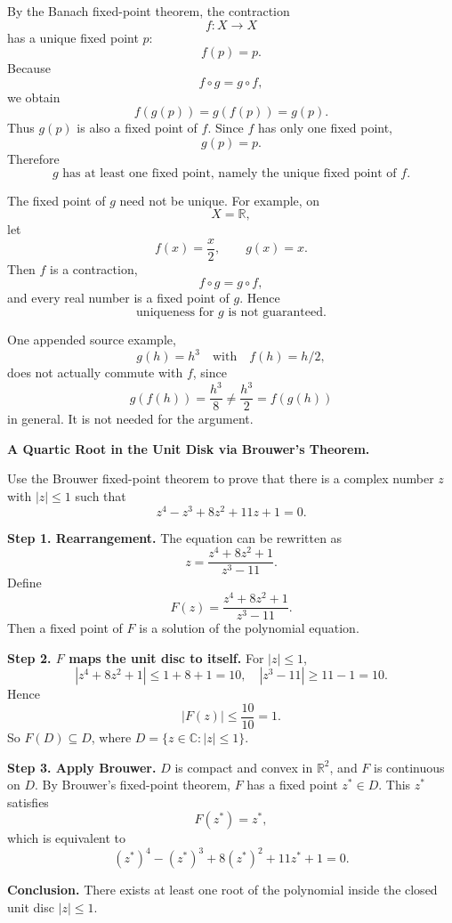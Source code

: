 \begin{solution}
By the Banach fixed-point theorem, the contraction
\[
f:X\to X
\]
has a unique fixed point \(p\):
\[
f(p)=p.
\]
Because
\[
f\circ g=g\circ f,
\]
we obtain
\[
f(g(p))
=
g(f(p))
=
g(p).
\]
Thus \(g(p)\) is also a fixed point of \(f\). Since \(f\) has only one fixed point,
\[
g(p)=p.
\]
Therefore
\[
\boxed{
g\text{ has at least one fixed point, namely the unique fixed point of }f.
}
\]

The fixed point of \(g\) need not be unique. For example, on
\[
X=\mathbb R,
\]
let
\[
f(x)=\frac x2,
\qquad
g(x)=x.
\]
Then \(f\) is a contraction,
\[
f\circ g=g\circ f,
\]
and every real number is a fixed point of \(g\). Hence
\[
\boxed{
\text{uniqueness for }g\text{ is not guaranteed}.
}
\]

One appended source example,
\[
g(h)=h^3
\quad\text{with}\quad
f(h)=h/2,
\]
does not actually commute with \(f\), since
\[
g(f(h))=\frac{h^3}{8}
\neq
\frac{h^3}{2}=f(g(h))
\]
in general. It is not needed for the argument.
\end{solution}


\begin{problem}[CP-II-0567]
\label{prob:cp-ii-0567}
\textbf{A Quartic Root in the Unit Disk via Brouwer's Theorem.}

\hspace*{1.5em}Use the Brouwer fixed-point theorem to prove that there is a complex number $z$ with $|z|\leq 1$ such that
\[
z^4 - z^3 + 8z^2 + 11z + 1 = 0.
\]
\end{problem}

\begin{solution}
\textbf{Step 1. Rearrangement.}
The equation can be rewritten as
\[
z = \frac{z^4 + 8z^2 + 1}{z^3 - 11}.
\]
Define
\[
F(z) = \frac{z^4 + 8z^2 + 1}{z^3 - 11}.
\]
Then a fixed point of $F$ is a solution of the polynomial equation.

\medskip

\textbf{Step 2. $F$ maps the unit disc to itself.}
For $|z|\leq 1$,
\[
|z^4 + 8z^2 + 1| \leq 1 + 8 + 1 = 10, \quad
|z^3 - 11| \geq 11 - 1 = 10.
\]
Hence
\[
|F(z)| \leq \frac{10}{10} = 1.
\]
So $F(D) \subseteq D$, where $D=\{z\in\mathbb{C}:|z|\leq 1\}$.

\medskip

\textbf{Step 3. Apply Brouwer.}
$D$ is compact and convex in $\mathbb{R}^2$, and $F$ is continuous on $D$.
By Brouwer's fixed-point theorem, $F$ has a fixed point $z^* \in D$.
This $z^*$ satisfies
\[
F(z^*) = z^*,
\]
which is equivalent to
\[
(z^*)^4 - (z^*)^3 + 8(z^*)^2 + 11z^* + 1 = 0.
\]

\medskip
\textbf{Conclusion.}
There exists at least one root of the polynomial inside the closed unit disc $|z|\leq 1$.
\end{solution}

